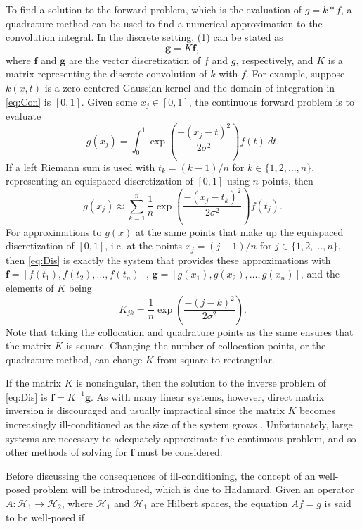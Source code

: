 \documentclass[12pt]{article}
\newcommand{\gVec}{\mathbf{g}}	%
\newcommand{\kMat}{K}	%
\newcommand{\fVec}{\mathbf{f}}	%
\newcommand{\noiseSD}{\sigma}	%
\begin{document}
To find a solution to the forward problem, which is the evaluation of $g = k * f$, a quadrature method can be used to find a numerical approximation to the convolution integral. In the discrete setting, (1) can be stated as
\begin{equation}
\gVec = \kMat\fVec,
\label{eq:Dis}
\end{equation}
where $\fVec$ and $\gVec$ are the vector discretization of $f$ and $g$, respectively, and $\kMat$ is a matrix representing the discrete convolution of $k$ with $f$. For example, suppose $k(x,t)$ is a zero-centered Gaussian kernel and the domain of integration in \eqref{eq:Con} is $[0,1]$. Given some $x_j \in [0,1]$, the continuous forward problem is to evaluate
\[g(x_j) = \int_0^1 \exp\left(\frac{-(x_j - t)^2}{2\noiseSD^2}\right)f(t) \: dt.\]
If a left Riemann sum is used with $t_k = (k-1)/n$ for $k \in \{1,2,\ldots,n\}$, representing an equispaced discretization of $[0,1]$ using $n$ points, then
\[g(x_j) \approx \sum_{k=1}^n \frac{1}{n}\exp\left(\frac{-(x_j - t_k)^2}{2\noiseSD^2}\right)f(t_j).\]
For approximations to $g(x)$ at the same points that make up the equispaced discretization of $[0,1]$, i.e. at the points $x_j = (j-1)/n$ for $j \in \{1,2,\ldots,n\}$, then \eqref{eq:Dis} is exactly the system that provides these approximations with $\fVec = [f(t_1),f(t_2),\ldots,f(t_n)]$, $\gVec = [g(x_1),g(x_2),\ldots,g(x_n)]$, and the elements of $\kMat$ being
\[K_{jk} = \frac{1}{n}\exp\left(\frac{-(j - k)^2}{2\noiseSD^2}\right).\]
Note that taking the collocation and quadrature points as the same ensures that the matrix $\kMat$ is square. Changing the number of collocation points, or the quadrature method, can change $\kMat$ from square to rectangular. \par
If the matrix $\kMat$ is nonsingular, then the solution to the inverse problem of \eqref{eq:Dis} is $\fVec = \kMat^{-1}\gVec$. As with many linear systems, however, direct matrix inversion is discouraged and usually impractical since the matrix $\kMat$ becomes increasingly ill-conditioned as the size of the system grows \cite{Vogel:2002}. Unfortunately, large systems are necessary to adequately approximate the continuous problem, and so other methods of solving for $\fVec$ must be considered. \par
Before discussing the consequences of ill-conditioning, the concept of an well-posed problem will be introduced, which is due to Hadamard. Given an operator $A : \mathcal{H}_1 \rightarrow \mathcal{H}_2$, where $\mathcal{H}_1$ and $\mathcal{H}_1$ are Hilbert spaces, the equation $Af = g$ is said to be well-posed if
\end{document}
